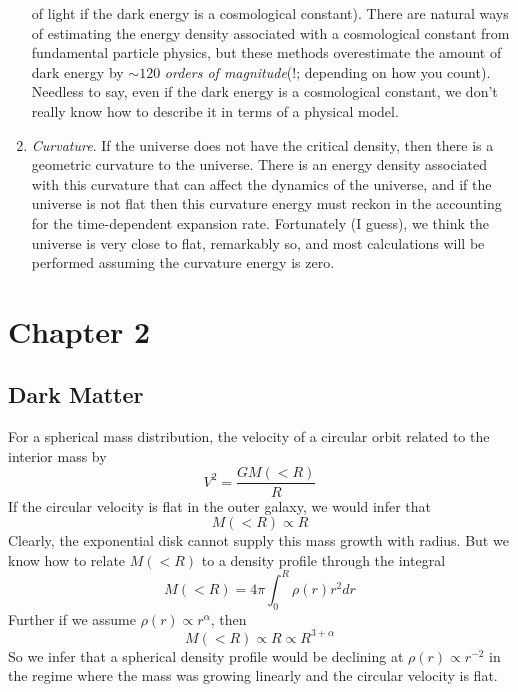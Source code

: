 \documentclass[]{article}
\begin{document}
\begin{enumerate}
of light if the dark energy is a cosmological constant). There are natural ways of
estimating the energy density associated with a cosmological constant from fundamental
particle physics, but these methods overestimate the amount of dark energy by $\sim120$
{\it orders of magnitude}(!; depending on how you count). Needless to say, even if the
dark energy is a cosmological constant, we don't really know how to describe it in terms
of a physical model.
\item {\it Curvature}. If the universe does not have the critical density, then there
is a geometric curvature to the universe. There is an energy density associated with this
curvature that can affect the dynamics of the universe, and if the universe is not flat then
this curvature energy must reckon in the accounting for the time-dependent expansion rate.  
Fortunately (I guess), we think the universe is very close to
flat, remarkably so, and most calculations will be performed assuming the curvature energy
is zero.
\end{enumerate}

\section{Chapter 2}

\subsection{Dark Matter}

For a spherical mass distribution, the velocity of
a circular orbit related to the interior mass by
\begin{equation}
V^2 = \frac{GM(<R)}{R}
\end{equation}
\noindent
If the circular velocity is flat in the outer 
galaxy, we would infer that
\begin{equation}
M(<R) \propto R
\end{equation}
\noindent
Clearly, the exponential disk cannot supply
this mass growth with radius.
But we know how to relate $M(<R)$ to a density
profile through the integral
\begin{equation}
M(<R) = 4\pi\int_0^{R}\rho(r)r^{2}dr
\end{equation}
\noindent
Further if we assume $\rho(r)\propto r^{\alpha}$,
then
\begin{equation}
M(<R) \propto R \propto R^{3 + \alpha}
\end{equation}
\noindent
So we infer that a spherical density profile would 
be declining at $\rho(r)\propto r^{-2}$ in the
regime where the mass was growing linearly and
the circular velocity is flat.
\end{document}

